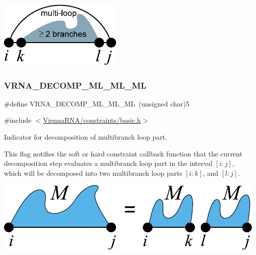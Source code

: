  
\begin{DoxyImageNoCaption}
  \mbox{\includegraphics[width=\textwidth,height=\textheight/2,keepaspectratio=true]{decomp_ml}}
\end{DoxyImageNoCaption}
 \mbox{\label{group__constraints_ga735517266f2e35e1374b8f1ea77ef23e}} 
\subsubsection{\texorpdfstring{VRNA\_DECOMP\_ML\_ML\_ML}{VRNA\_DECOMP\_ML\_ML\_ML}}
{\footnotesize\ttfamily \#define V\+R\+N\+A\+\_\+\+D\+E\+C\+O\+M\+P\+\_\+\+M\+L\+\_\+\+M\+L\+\_\+\+ML~(unsigned char)5}



{\ttfamily \#include $<$\mbox{\hyperlink{constraints_2basic_8h}{Vienna\+R\+N\+A/constraints/basic.\+h}}$>$}



Indicator for decomposition of multibranch loop part. 

This flag notifies the soft or hard constraint callback function that the current decomposition step evaluates a multibranch loop part in the interval $[i:j]$, which will be decomposed into two multibranch loop parts $[i:k]$, and $[l:j]$.

 
\begin{DoxyImageNoCaption}
  \mbox{\includegraphics[width=\textwidth,height=\textheight/2,keepaspectratio=true]{decomp_ml_ml_ml}}
\end{DoxyImageNoCaption}
 \mbox{\label{group__constraints_ga4a23054c75d8efc785de50e3ea87602f}} 
